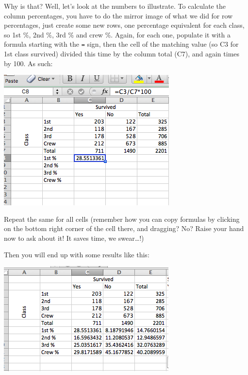 \documentclass[
]{book}
\begin{document}
Why is that? Well, let's look at the numbers to illustrate. To calculate the column percentages, you have to do the mirror image of what we did for row percentages, just create some new rows, one percentage equivalent for each class, so 1st \%, 2nd \%, 3rd \% and crew \%. Again, for each one, populate it with a formula starting with the \texttt{=} sign, then the cell of the matching value (so C3 for 1st class survived) divided this time by the column total (C7), and again times by 100. As such:

\includegraphics{imgs/col_perc_calc.png}

Repeat the same for all cells (remember how you can copy formulas by clicking on the bottom right corner of the cell there, and dragging? No? Raise your hand now to ask about it! It saves time, we swear\ldots!)

Then you will end up with some results like this:

\includegraphics{imgs/all_col_perc.png}
\end{document}
